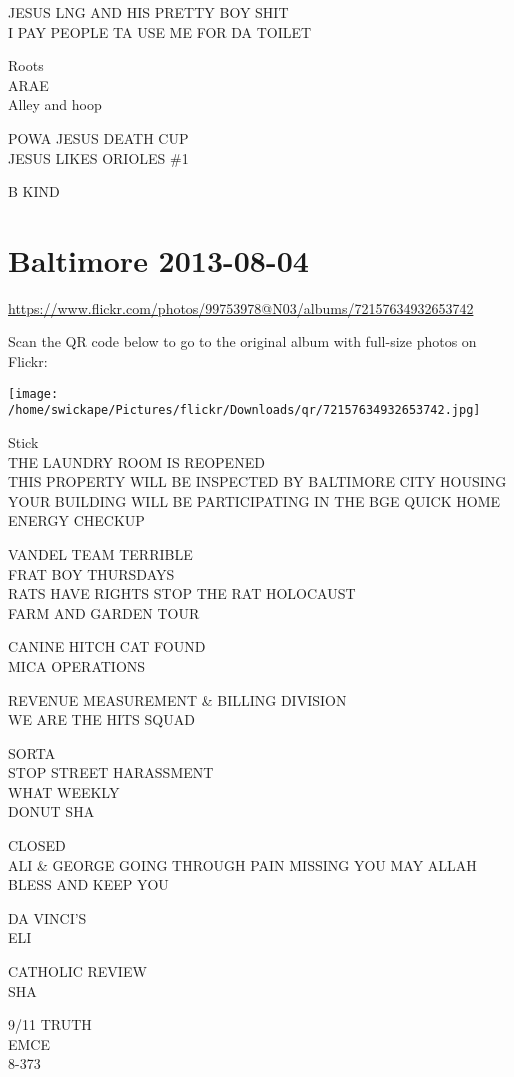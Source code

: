 \documentclass[10pt,letterpaper]{article}
\begin{document}
JESUS LNG AND HIS PRETTY BOY SHIT\\
I PAY PEOPLE TA USE ME FOR DA TOILET

Roots\\
ARAE\\
Alley and hoop

POWA JESUS DEATH CUP\\
JESUS LIKES ORIOLES \#1

B KIND
\pagebreak

\section*{Baltimore 2013-08-04}

\url{https://www.flickr.com/photos/99753978@N03/albums/72157634932653742}

Scan the QR code below to go to the original album with full-size photos on Flickr:

\texttt{[image: /home/swickape/Pictures/flickr/Downloads/qr/72157634932653742.jpg]}
\pagebreak

Stick\\
THE LAUNDRY ROOM IS REOPENED\\
THIS PROPERTY WILL BE INSPECTED BY BALTIMORE CITY HOUSING\\
YOUR BUILDING WILL BE PARTICIPATING IN THE BGE QUICK HOME ENERGY CHECKUP

VANDEL TEAM TERRIBLE\\
FRAT BOY THURSDAYS\\
RATS HAVE RIGHTS STOP THE RAT HOLOCAUST\\
FARM AND GARDEN TOUR

CANINE HITCH CAT FOUND\\
MICA OPERATIONS

REVENUE MEASUREMENT \& BILLING DIVISION\\
WE ARE THE HITS SQUAD

SORTA\\
STOP STREET HARASSMENT\\
WHAT WEEKLY\\
DONUT SHA

CLOSED\\
ALI \& GEORGE GOING THROUGH PAIN MISSING YOU MAY ALLAH BLESS AND KEEP YOU

DA VINCI'S\\
ELI

CATHOLIC REVIEW\\
SHA

9/11 TRUTH\\
EMCE\\
8{-}373
\end{document}
